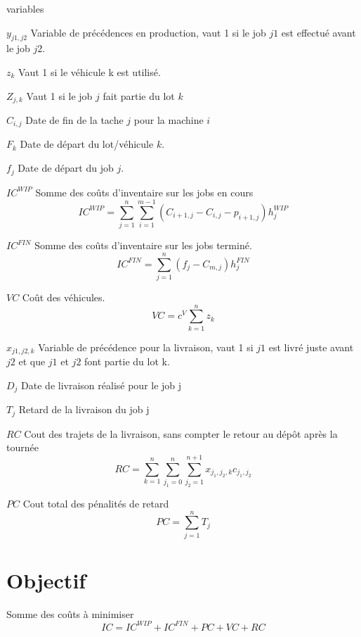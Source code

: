 \begin{labeling}{variables}
	\item [$y_{j1,j2}$] Variable de précédences en production, vaut 1 si le job $j1$ est effectué avant le job $j2$.
	\item [$z_k$] Vaut 1 si le véhicule k est utilisé.
	\item [$Z_{j,k}$] Vaut 1 si le job $j$ fait partie du lot $k$
	\item [$C_{i,j}$] Date de fin de la tache $j$ pour la machine $i$
	\item [$F_k$] Date de départ du lot/véhicule $k$.
	\item [$f_j$] Date de départ du job $j$.
	\item [$IC^{WIP}$] Somme des coûts d’inventaire sur les jobs en cours
	$$IC^{WIP}=\sum_{j=1}^{n}\sum_{i=1}^{m-1}{\left(C_{i+1,j}-C_{i,j}-p_{i+1,j}\right)h_j^{WIP}}$$

	\item [$IC^{FIN}$] Somme des coûts d’inventaire sur les jobs terminé.
	$${IC}^{FIN}=\sum_{j=1}^{n}{\left(f_j-C_{m,j}\right)h_j^{FIN}}$$
	\item[$VC$] Coût des véhicules.
	$$VC=c^V\sum_{k=1}^{n}z_k$$

	\item [$x_{j1,j2,k}$] Variable de précédence pour la livraison, vaut 1 si $j1$ est livré juste avant $j2$ et que $j1$ et $j2$ font partie du lot k.
	\item [$D_j$] Date de livraison réalisé pour le job j
	\item [$T_j$] Retard de la livraison du job j
	\item [$RC$] Cout des trajets de la livraison, sans compter le retour au dépôt après la tournée
	$$RC=\sum_{k=1}^{n}{\sum_{j_1=0}^{n}\sum_{j_2=1}^{n+1}x_{j_1,j_2,k}c_{j_1,j_2}}$$
	\item [$PC$]	Cout total des pénalités de retard
	$$PC=\sum_{j=1}^{n} T_j$$


\end{labeling}


\section*{Objectif}
Somme des coûts à minimiser
$$IC=IC^{WIP}+IC^{FIN}+PC+VC+RC$$


